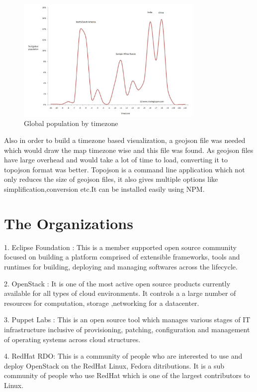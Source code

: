 \documentclass[double,12pt]{beavtex}
\begin{document}
\begin{figure}[!ht]
\centering
\includegraphics[width=90mm]{pop1.jpg}
\caption{Global population by timezone}
\end{figure}

Also in order to build a timezone based visualization, a geojson file was needed which would draw the map timezone wise and this file was found. As geojson files have large overhead and would take a lot of time to load, converting it to topojson format was better. Topojson is a command line application which not only reduces the size of geojson files, it also gives multiple options like simplification,conversion etc.It can be installed easily using NPM.

\section{The Organizations}

1. Eclipse Foundation :
This is a member supported open source community focused on building a platform comprised of extensible frameworks, tools and runtimes for building, deploying and managing softwares across the lifecycle.

2. OpenStack :
It is one of the most active open source products currently available for all types of cloud environments. It controls a a large number of resources for computation, storage ,networking for a datacenter.

3. Puppet Labs :
This is an open source tool which manages various stages of IT infrastructure inclusive of provisioning, patching, configuration and management of operating systems across cloud structures.

4. RedHat RDO:
This is a community of people who are interested to use and deploy OpenStack on the RedHat Linux, Fedora ditributions. It is a sub community of people who use RedHat which is one of the largest contributors to Linux.
\end{document}
